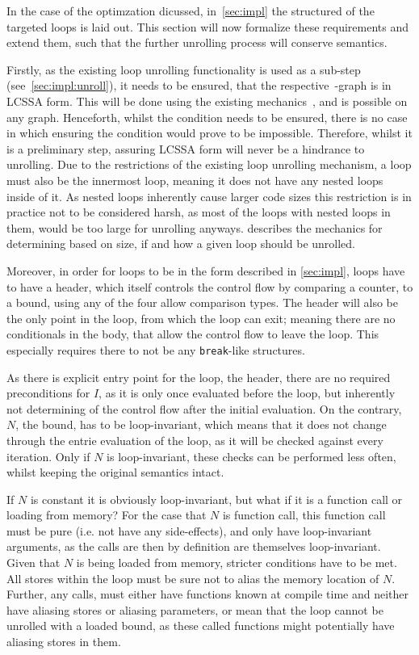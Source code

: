 In the case of the optimzation dicussed, in~\cref{sec:impl} the structured of the targeted loops is laid out.
This section will now formalize these requirements and extend them, such that the further unrolling process will conserve semantics.

Firstly, as the existing loop unrolling functionality is used as a sub-step (see~\cref{sec:impl:unroll}), it needs to be ensured, that the respective~\libFIRM-graph is in LCSSA form.
This will be done using the existing mechanics~\cite{aebi18bachelorarbeit}, and is possible on any graph.
Henceforth, whilst the condition needs to be ensured, there is no case in which ensuring the condition would prove to be impossible.
Therefore, whilst it is a preliminary step, assuring LCSSA form will never be a hindrance to unrolling.
Due to the restrictions of the existing loop unrolling mechanism, a loop must also be the innermost loop, meaning it does not have any nested loops inside of it.
As nested loops inherently cause larger code sizes this restriction is in practice not to be considered harsh, as most of the loops with nested loops in them, would be too large for unrolling anyways.
 describes the mechanics for determining based on size, if and how a given loop should be unrolled.

Moreover, in order for loops to be in the form described in \cref{sec:impl}, loops have to have a header, which itself controls the control flow by comparing a counter, to a bound, using any of the four allow comparison types.
The header will also be the only point in the loop, from which the loop can exit; meaning there are no conditionals in the body, that allow the control flow to leave the loop.
This especially requires there to not be any \texttt{break}-like structures.

As there is explicit entry point for the loop, the header, there are no required preconditions for $I$, as it is only once evaluated before the loop, but inherently not determining of the control flow after the initial evaluation.
On the contrary, $N$, the bound, has to be loop-invariant, which means that it does not change through the entrie evaluation of the loop, as it will be checked against every iteration.
Only if $N$ is loop-invariant, these checks can be performed less often, whilst keeping the original semantics intact.

If $N$ is constant it is obviously loop-invariant, but what if it is a function call or loading from memory?
For the case that $N$ is function call, this function call must be pure (i.e. not have any side-effects), and only have loop-invariant arguments, as the calls are then by definition are themselves loop-invariant.
Given that $N$ is being loaded from memory, stricter conditions have to be met.
All stores within the loop must be sure not to alias the memory location of $N$.
Further, any calls, must either have functions known at compile time and neither have aliasing stores or aliasing parameters, or mean that the loop cannot be unrolled with a loaded bound, as these called functions might potentially have aliasing stores in them.

